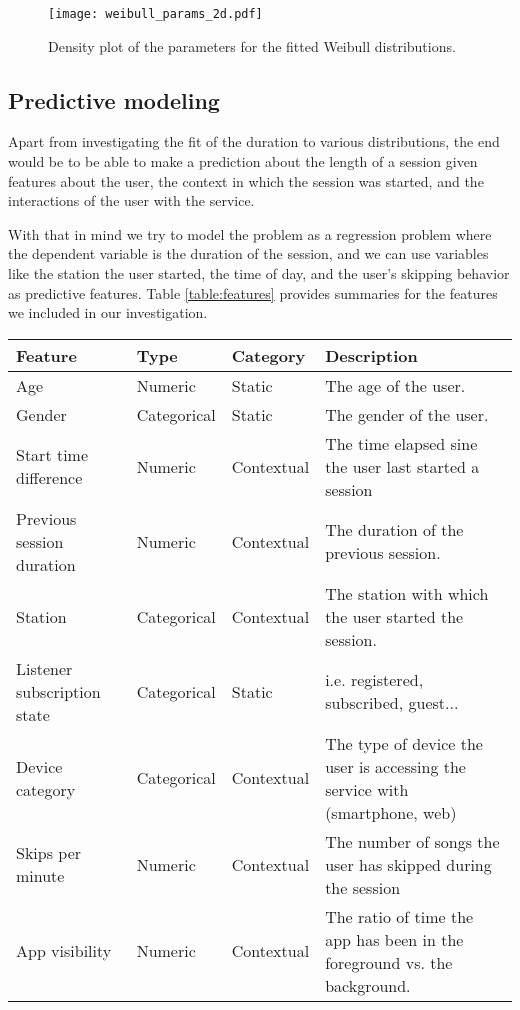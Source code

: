 \begin{figure}
	\texttt{[image: weibull\_params\_2d.pdf]}
	\caption{Density plot of the parameters for the fitted Weibull distributions.}
	\label{fit:params_2d}
\end{figure}


\subsection{Predictive modeling}

Apart from investigating the fit of the duration to various distributions, the end would be to
be able to make a prediction about the length of a session given features about the user,
the context in which the session was started, and the interactions of the user with the service.

With that in mind we try to model the problem as a regression problem where the dependent
variable is the duration of the session, and we can use variables like the station the user started,
the time of day, and the user's skipping behavior as predictive features. Table \ref{table:features}
provides summaries for the features we included in our investigation.

\begin{tabular}{|p{1cm}|p{1.5cm}|p{1.6cm}|p{3cm}|}
	\hline 
	\textbf{Feature} & \textbf{Type} & \textbf{Category} & \textbf{Description }\\ 
	\hline 
	Age & Numeric & Static & The age of the user. \\ 
	\hline 
	Gender & Categorical & Static & The gender of the user. \\ 
	\hline 
	Start time difference & Numeric & Contextual & The time elapsed sine the user last started a session \\ 
	\hline 
	Previous session duration & Numeric & Contextual & The duration of the previous session. \\ 
	\hline 
	Station & Categorical & Contextual & The station with which the user started the session. \\ 
	\hline 
	Listener subscription state & Categorical & Static & i.e. registered, subscribed, guest... \\ 
	\hline 
	Device category & Categorical & Contextual & The type of device the user is accessing the service with (smartphone, web) \\ 
	\hline 
	Skips per minute & Numeric & Contextual  & The number of songs the user has skipped during the session  \\ 
	\hline 
	App visibility & Numeric  & Contextual  & The ratio of time the app has been in the foreground vs. the background. \\ 
	\hline 
\end{tabular}

